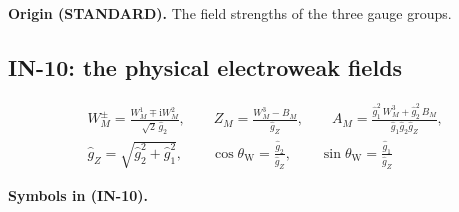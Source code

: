 \documentclass[
  10pt,
]{article}
\begin{document}
\textbf{Origin (STANDARD).} The field strengths of the three gauge
groups.

\hypertarget{in-10-the-physical-electroweak-fields}{%
\subsection{IN-10: the physical electroweak
fields}\label{in-10-the-physical-electroweak-fields}}

\[
\begin{aligned}
&W^\pm_M = \frac{W^1_M \mp \mathrm{i}W^2_M}{\sqrt2\,\hat g_2},\qquad
 Z_M = \frac{W^3_M - B_M}{\hat g_Z},\qquad A_M = \frac{\hat g_1^2\,W^3_M + \hat g_2^2\,B_M}{\hat g_1\hat
 g_2\hat g_Z},\\
&\hat g_Z = \sqrt{\hat g_2^2 + \hat g_1^2},\qquad \cos\theta_{\mathrm{W}} = \frac{\hat g_2}{\hat g_Z},\qquad
 \sin\theta_{\mathrm{W}} = \frac{\hat g_1}{\hat g_Z}
\end{aligned} \tag{IN-10}
\]

\textbf{Symbols in (IN-10).}
\end{document}
